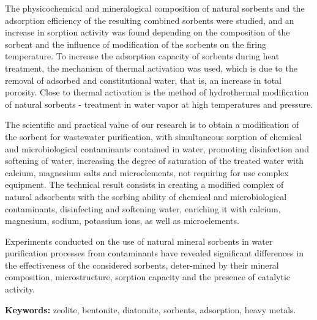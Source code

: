 The physicochemical and mineralogical composition of natural sorbents
and the adsorption efficiency of the resulting combined sorbents were
studied, and an increase in sorption activity was found depending on the
composition of the sorbent and the influence of modification of the
sorbents on the firing temperature. To increase the adsorption capacity
of sorbents during heat treatment, the mechanism of thermal activation
was used, which is due to the removal of adsorbed and constitutional
water, that is, an increase in total porosity. Close to thermal
activation is the method of hydrothermal modification of natural
sorbents - treatment in water vapor at high temperatures and pressure.

The scientific and practical value of our research is to obtain a
modification of the sorbent for wastewater purification, with
simultaneous sorption of chemical and microbiological contaminants
contained in water, promoting disinfection and softening of water,
increasing the degree of saturation of the treated water with calcium,
magnesium salts and microelements, not requiring for use complex
equipment. The technical result consists in creating a modified complex
of natural adsorbents with the sorbing ability of chemical and
microbiological contaminants, disinfecting and softening water,
enriching it with calcium, magnesium, sodium, potassium ions, as well as
microelements.

Experiments conducted on the use of natural mineral sorbents in water
purification processes from contaminants have revealed significant
differences in the effectiveness of the considered sorbents, deter-mined
by their mineral composition, microstructure, sorption capacity and the
presence of catalytic activity.

{\bfseries Keywords:} zeolite, bentonite, diatomite, sorbents, adsorption,
heavy metals.

